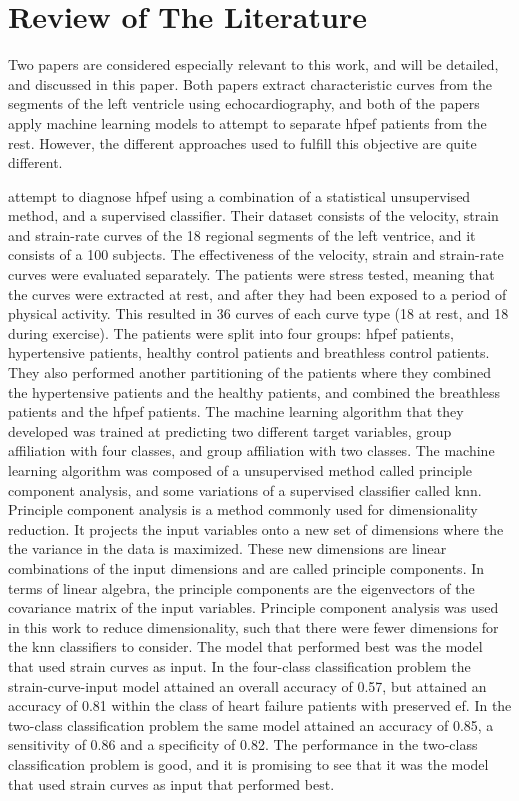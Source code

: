 \chapter{Review of The Literature} \label{chap:lit}

Two papers are considered especially relevant to this work, and will be detailed, and discussed in this paper. Both papers extract characteristic curves from the segments of the left ventricle using echocardiography, and both of the papers apply machine learning models to attempt to separate \acrshort{hfpef} patients from the rest. However, the different approaches used to fulfill this objective are quite different. 

\textcite{hf_diagnosis_ml} attempt to diagnose \acrshort{hfpef} using a combination of a statistical unsupervised method, and a supervised classifier. Their dataset consists of the velocity, strain and strain-rate curves of the 18 regional segments of the left ventrice, and it consists of a 100 subjects. The effectiveness of the velocity, strain and strain-rate curves were evaluated separately. The patients were stress tested, meaning that the curves were extracted at rest, and after they had been exposed to a period of physical activity. This resulted in 36 curves of each curve type (18 at rest, and 18 during exercise). The patients were split into four groups: \acrshort{hfpef} patients, hypertensive patients, healthy control patients and breathless control patients. They also performed another partitioning of the patients where they combined the hypertensive patients and the healthy patients, and combined the breathless patients and the \acrshort{hfpef} patients. The machine learning algorithm that they developed was trained at predicting two different target variables, group affiliation with four classes, and group affiliation with two classes. The machine learning algorithm was composed of a unsupervised method called principle component analysis, and some variations of a supervised classifier called \acrfull{knn}. Principle component analysis is a method commonly used for dimensionality reduction. It projects the input variables onto a new set of dimensions where the the variance in the data is maximized. These new dimensions are linear combinations of the input dimensions and are called principle components. In terms of linear algebra, the principle components are the eigenvectors of the covariance matrix of the input variables. Principle component analysis was used in this work to reduce  dimensionality, such that there were fewer dimensions for the \acrshort{knn} classifiers to consider. The model that performed best was the model that used strain curves as input. In the four-class classification problem the strain-curve-input model attained an overall accuracy of 0.57, but attained an accuracy of 0.81 within the class of heart failure patients with preserved \acrshort{ef}. In the two-class classification problem the same model attained an accuracy of 0.85, a sensitivity of 0.86 and a specificity of 0.82. The performance in the two-class classification problem is good, and it is promising to see that it was the model that used strain curves as input that performed best. \bigskip

